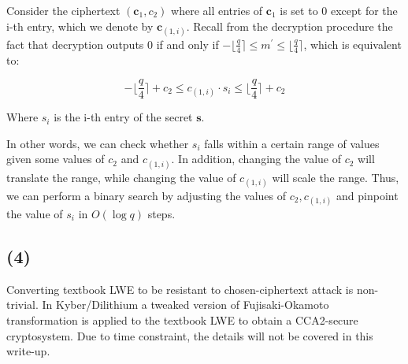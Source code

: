 \documentclass{article}
\newcommand{\round}[1]{\lfloor {#1} \rceil}
\begin{document}
Consider the ciphertext $(\mathbf{c}_1, c_2)$ where all entries of $\mathbf{c}_1$ is set to 0 except for the i-th entry, which we denote by $\mathbf{c}_{(1, i)}$. Recall from the decryption procedure the fact that decryption outputs $0$ if and only if $-\round{\frac{q}{4}} \leq m^\prime \leq \round{\frac{q}{4}}$, which is equivalent to:

$$
-\round{\frac{q}{4}} + c_2 \leq c_{(1, i)} \cdot s_i \leq \round{\frac{q}{4}} + c_2
$$

Where $s_i$ is the i-th entry of the secret $\mathbf{s}$.

In other words, we can check whether $s_i$ falls within a certain range of values given some values of $c_2$ and $c_{(1, i)}$. In addition, changing the value of $c_2$ will translate the range, while changing the value of $c_{(1, i)}$ will scale the range. Thus, we can perform a binary search by adjusting the values of $c_2, c_{(1, i)}$ and pinpoint the value of $s_i$ in $O(\log{q})$ steps.

\subsection*{(4)}
Converting textbook LWE to be resistant to chosen-ciphertext attack is non-trivial. In Kyber/Dilithium a tweaked version of Fujisaki-Okamoto transformation is applied to the textbook LWE to obtain a CCA2-secure cryptosystem. Due to time constraint, the details will not be covered in this write-up.
\end{document}
